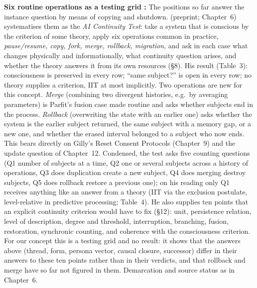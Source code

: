 \documentclass[acmlarge, nonacm]{acmart}
\begin{document}
\textbf{Six routine operations as a testing grid \cite{dayathilake2026}:} The positions so far answer the instance question by means of copying and shutdown. \citet{dayathilake2026} (preprint; Chapter~6) systematises them as the \textit{AI Continuity Test}: take a system that is conscious by the criterion of some theory, apply six operations common in practice, \textit{pause/resume, copy, fork, merge, rollback, migration}, and ask in each case what changes physically and informationally, what continuity question arises, and whether the theory answers it from its own resources (§8). His result (Table~3): consciousness is preserved in every row; ``same subject?'' is open in every row; no theory supplies a criterion, IIT at most implicitly. Two operations are new for this concept. \textit{Merge} (combining two divergent histories, e.g.\ by averaging parameters) is Parfit's fusion case made routine and asks whether subjects end in the process. \textit{Rollback} (overwriting the state with an earlier one) asks whether the system is the earlier subject returned, the same subject with a memory gap, or a new one, and whether the erased interval belonged to a subject who now ends. This bears directly on Gilly's Reset Consent Protocols (Chapter~9) and the update question of Chapter~12. Condensed, the test asks five counting questions (Q1 number of subjects at a time, Q2 one or several subjects across a history of operations, Q3 does duplication create a new subject, Q4 does merging destroy subjects, Q5 does rollback restore a previous one); on his reading only Q1 receives anything like an answer from a theory (IIT via the exclusion postulate, level-relative in predictive processing; Table~4). He also supplies ten points that an explicit continuity criterion would have to fix (§12): unit, persistence relation, level of description, degree and threshold, interruption, branching, fusion, restoration, synchronic counting, and coherence with the consciousness criterion. For our concept this is a testing grid and no result: it shows that the answers above (thread, form, persona vector, causal closure, successor) differ in their answers to these ten points rather than in their verdicts, and that rollback and merge have so far not figured in them. Demarcation and source status as in Chapter~6.
\end{document}
